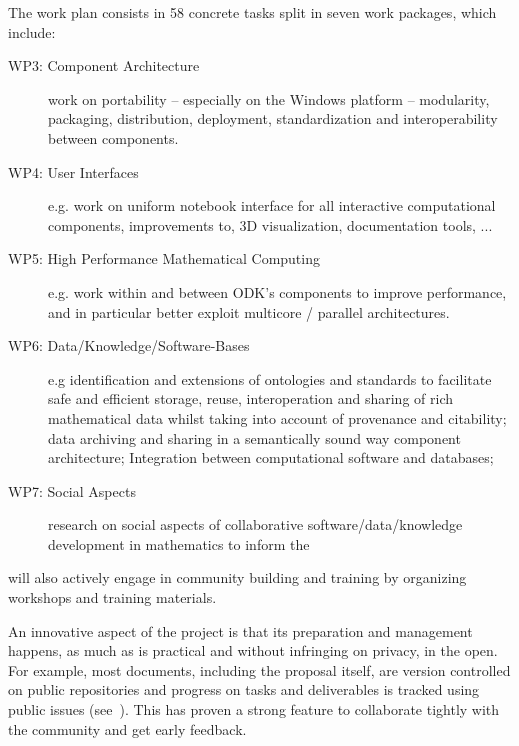 The \ODK work plan consists in 58 concrete tasks split in seven work packages, which
include:
\begin{description}
\item[WP3: Component Architecture] work on portability -- especially
  on the Windows platform -- modularity, packaging, distribution,
  deployment, standardization and interoperability between components.
\item[WP4: User Interfaces] e.g. work on uniform \Jupyter notebook
  interface for all interactive computational components, improvements
  to\Jupyter, 3D visualization, documentation tools, ...
\item[WP5: High Performance Mathematical Computing] e.g. work within
  and between ODK's components to improve performance, and in
  particular better exploit multicore / parallel architectures.
\item[WP6: Data/Knowledge/Software-Bases] e.g identification and extensions of ontologies
  and standards to facilitate safe and efficient storage, reuse, interoperation and
  sharing of rich mathematical data whilst taking into account of provenance and
  citability; data archiving and sharing in a semantically sound way component
  architecture; Integration between computational software and databases;
\item[WP7: Social Aspects] research on social aspects of collaborative
  software/data/knowledge development in mathematics to inform the
\end{description}
\ODK will also actively engage in community building and training by organizing workshops
and training materials.

An innovative aspect of the \ODK project is that its preparation and management happens,
as much as is practical and without infringing on privacy, in the open. For example, most
documents, including the proposal itself, are version controlled on public repositories
and progress on tasks and deliverables is tracked using public issues
(see~\cite{OpenDreamKit:on}). This has proven a strong feature to collaborate tightly with
the community and get early feedback.


